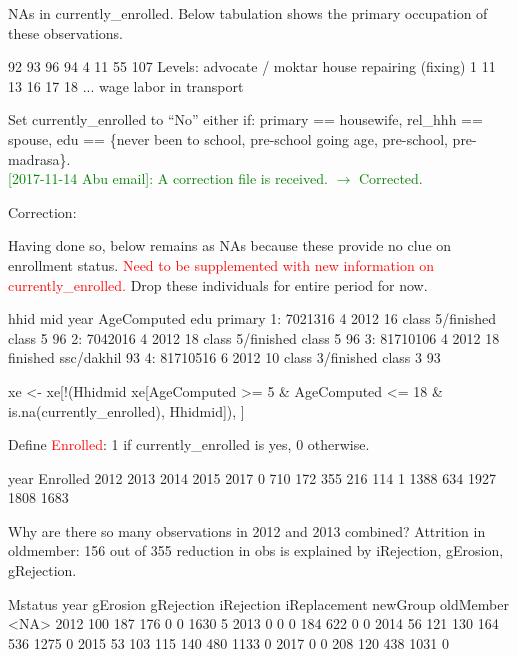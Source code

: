 NAs in \textsf{currently\_enrolled}. Below tabulation shows the primary occupation of these observations.
\begin{Schunk}
\begin{Soutput}
[1] 92 93 96 94 4  11 55
107 Levels:  advocate / moktar  house repairing (fixing) 1 11 13 16 17 18 ... wage labor in transport
\end{Soutput}
\end{Schunk}
Set \textsf{currently\_enrolled} to ``No'' either if: \textsf{primary} == housewife, \textsf{rel\_hhh} == spouse, \textsf{edu} == {\footnotesize \{never been to school, pre-school going age, pre-school, pre-madrasa\}}. 	\\
\textcolor{green}{[2017-11-14 Abu email]: A correction file is received. $\rightarrow$ Corrected.}
\gobblepars

Correction:

Having done so, below remains as NAs because these provide no clue on enrollment status. \textcolor{red}{Need to be supplemented with new information on \textsf{currently\_enrolled}.} Drop these individuals for entire period for now. 
\begin{Schunk}
\begin{Soutput}
       hhid mid year AgeComputed                       edu primary
1:  7021316   4 2012          16  class 5/finished class 5      96
2:  7042016   4 2012          18  class 5/finished class 5      96
3: 81710106   4 2012          18       finished ssc/dakhil      93
4: 81710516   6 2012          10 class 3/finished class 3       93
\end{Soutput}
\end{Schunk}
\begin{Schunk}
\begin{Sinput}
xe <- xe[!(Hhidmid %in% 
	xe[AgeComputed >= 5 & AgeComputed <= 18 & is.na(currently_enrolled), Hhidmid]), ]
\end{Sinput}
\end{Schunk}
Define \textcolor{red}{\textsf{Enrolled}}: 1 if \textsf{currently\_enrolled} is yes, 0 otherwise. \gobblepars
\begin{Schunk}
\begin{Soutput}
        year
Enrolled 2012 2013 2014 2015 2017
       0  710  172  355  216  114
       1 1388  634 1927 1808 1683
\end{Soutput}
\end{Schunk}
Why are there so many observations in 2012 and 2013 combined? Attrition in \textsf{oldmember}: 156 out of 355 reduction in obs is explained by iRejection, gErosion, gRejection. 
\begin{Schunk}
\begin{Soutput}
      Mstatus
year   gErosion gRejection iRejection iReplacement newGroup oldMember <NA>
  2012      100        187        176            0        0      1630    5
  2013        0          0          0          184      622         0    0
  2014       56        121        130          164      536      1275    0
  2015       53        103        115          140      480      1133    0
  2017        0          0        208          120      438      1031    0
\end{Soutput}
\end{Schunk}

